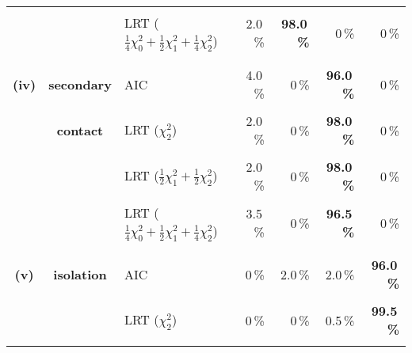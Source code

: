 \documentclass[11pt]{article}
\begin{document}
\begin{table}[!b]
\begin{center}
{\begin{tabular}{|c|c|l|rrrr|}
\vspace*{-3mm} & & & & & &  \\
            &                 & LRT ($\frac{1}{4} \chi^2_0 +\frac{1}{2} \chi^2_1 +\frac{1}{4} \chi^2_2$)   & 2.0\,\% & {\bf 98.0\,\%} &0\,\% & 0\,\% \\ 
\vspace*{-2mm} & & & & & &  \\
\hline
\vspace*{-2mm} & & & & & &  \\
{\bf (iv)} & {\bf secondary} & AIC                                                                                                         & 4.0\,\% & 0\,\% & {\bf 96.0\,\%} & 0\,\% \\
\vspace*{-3mm} & & & & & &  \\
            &      {\bf contact}  & LRT ($\chi^2_2$)                                                                                       & 2.0\,\% & 0\,\% & {\bf 98.0\,\%} & 0\,\% \\ 
\vspace*{-3mm} & & & & & &  \\
            &                          & LRT ($\frac{1}{2} \chi^2_1 +\frac{1}{2} \chi^2_2$)                                    & 2.0\,\% & 0\,\% & {\bf 98.0\,\%} & 0\,\% \\
\vspace*{-3mm} & & & & & &  \\
            &                          & LRT ($\frac{1}{4} \chi^2_0 +\frac{1}{2} \chi^2_1 +\frac{1}{4} \chi^2_2$)  & 3.5\,\% & 0\,\% & {\bf 96.5\,\%} & 0\,\%  \\ 
\vspace*{-2mm} & & & & & &  \\
\hline
\vspace*{-2mm} & & & & & &  \\
{\bf (v)} & {\bf isolation} & AIC                                                                                                          & 0\,\% &2.0\,\% & 2.0\,\% & {\bf 96.0\,\%} \\
\vspace*{-3mm} & & & & & &  \\
            &                       & LRT ($\chi^2_2$)                                                                                       & 0\,\% &0\,\% & 0.5\,\% & {\bf 99.5\,\%} \\
\vspace*{-3mm} & & & & & &  \\

\end{tabular}}
\end{center}
\end{table}
\end{document}
